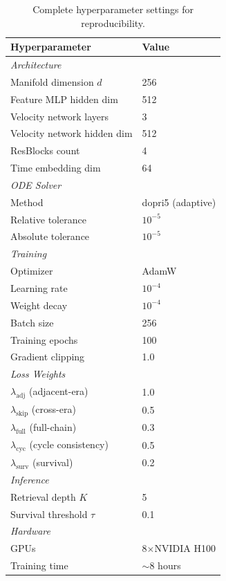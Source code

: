 \documentclass{article}
\begin{document}
\begin{table}[h]
\centering
\caption{Complete hyperparameter settings for reproducibility.}
\label{tab:hyperparams}
\begin{tabular}{ll}
\toprule
\textbf{Hyperparameter} & \textbf{Value} \\
\midrule
\multicolumn{2}{l}{\textit{Architecture}} \\
Manifold dimension $d$ & 256 \\
Feature MLP hidden dim & 512 \\
Velocity network layers & 3 \\
Velocity network hidden dim & 512 \\
ResBlocks count & 4 \\
Time embedding dim & 64 \\
\midrule
\multicolumn{2}{l}{\textit{ODE Solver}} \\
Method & dopri5 (adaptive) \\
Relative tolerance & $10^{-5}$ \\
Absolute tolerance & $10^{-5}$ \\
\midrule
\multicolumn{2}{l}{\textit{Training}} \\
Optimizer & AdamW \\
Learning rate & $10^{-4}$ \\
Weight decay & $10^{-4}$ \\
Batch size & 256 \\
Training epochs & 100 \\
Gradient clipping & 1.0 \\
\midrule
\multicolumn{2}{l}{\textit{Loss Weights}} \\
$\lambda_{\text{adj}}$ (adjacent-era) & 1.0 \\
$\lambda_{\text{skip}}$ (cross-era) & 0.5 \\
$\lambda_{\text{full}}$ (full-chain) & 0.3 \\
$\lambda_{\text{cyc}}$ (cycle consistency) & 0.5 \\
$\lambda_{\text{surv}}$ (survival) & 0.2 \\
\midrule
\multicolumn{2}{l}{\textit{Inference}} \\
Retrieval depth $K$ & 5 \\
Survival threshold $\tau$ & 0.1 \\
\midrule
\multicolumn{2}{l}{\textit{Hardware}} \\
GPUs & 8$\times$NVIDIA H100 \\
Training time & $\sim$8 hours \\
\bottomrule
\end{tabular}
\end{table}
\end{document}

